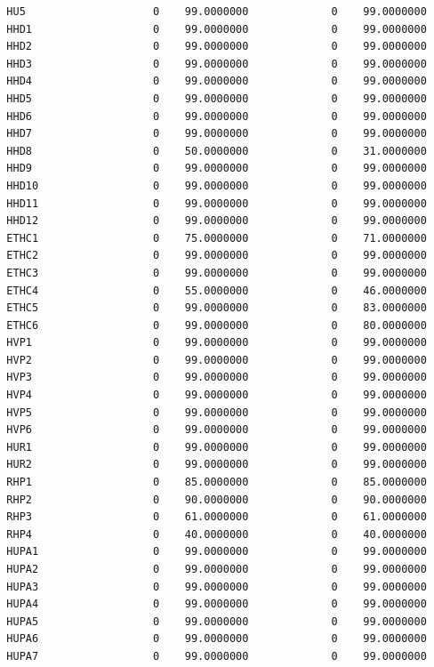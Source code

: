 \documentclass[
  11pt,
  a4paper,
  DIV=12,captions=tableheading,oneside,titlepage]{scrbook}
\begin{document}
\begin{verbatim}
  HU5                    0    99.0000000             0    99.0000000 
  HHD1                   0    99.0000000             0    99.0000000 
  HHD2                   0    99.0000000             0    99.0000000 
  HHD3                   0    99.0000000             0    99.0000000 
  HHD4                   0    99.0000000             0    99.0000000 
  HHD5                   0    99.0000000             0    99.0000000 
  HHD6                   0    99.0000000             0    99.0000000 
  HHD7                   0    99.0000000             0    99.0000000 
  HHD8                   0    50.0000000             0    31.0000000 
  HHD9                   0    99.0000000             0    99.0000000 
  HHD10                  0    99.0000000             0    99.0000000 
  HHD11                  0    99.0000000             0    99.0000000 
  HHD12                  0    99.0000000             0    99.0000000 
  ETHC1                  0    75.0000000             0    71.0000000 
  ETHC2                  0    99.0000000             0    99.0000000 
  ETHC3                  0    99.0000000             0    99.0000000 
  ETHC4                  0    55.0000000             0    46.0000000 
  ETHC5                  0    99.0000000             0    83.0000000 
  ETHC6                  0    99.0000000             0    80.0000000 
  HVP1                   0    99.0000000             0    99.0000000 
  HVP2                   0    99.0000000             0    99.0000000 
  HVP3                   0    99.0000000             0    99.0000000 
  HVP4                   0    99.0000000             0    99.0000000 
  HVP5                   0    99.0000000             0    99.0000000 
  HVP6                   0    99.0000000             0    99.0000000 
  HUR1                   0    99.0000000             0    99.0000000 
  HUR2                   0    99.0000000             0    99.0000000 
  RHP1                   0    85.0000000             0    85.0000000 
  RHP2                   0    90.0000000             0    90.0000000 
  RHP3                   0    61.0000000             0    61.0000000 
  RHP4                   0    40.0000000             0    40.0000000 
  HUPA1                  0    99.0000000             0    99.0000000 
  HUPA2                  0    99.0000000             0    99.0000000 
  HUPA3                  0    99.0000000             0    99.0000000 
  HUPA4                  0    99.0000000             0    99.0000000 
  HUPA5                  0    99.0000000             0    99.0000000 
  HUPA6                  0    99.0000000             0    99.0000000 
  HUPA7                  0    99.0000000             0    99.0000000 

\end{verbatim}
\end{document}
